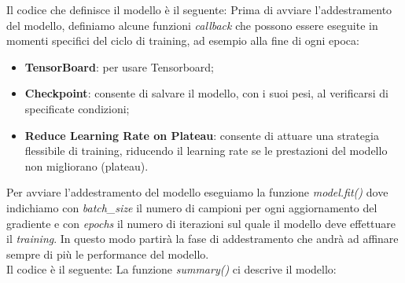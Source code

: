 \newline Il codice che definisce il modello è il seguente:
\vspace*{2ex}
\vspace*{2ex}
\noindent Prima di avviare l'addestramento del modello, definiamo alcune funzioni \textit{callback} che possono essere eseguite in momenti specifici del ciclo di training, ad esempio alla fine di ogni epoca:
\begin{itemize}
	\item \textbf{TensorBoard}: per usare Tensorboard;
	\item \textbf{Checkpoint}: consente di salvare il modello, con i suoi pesi, al verificarsi di specificate condizioni;
	\item \textbf{Reduce Learning Rate on Plateau}: consente di attuare una strategia flessibile di training, riducendo il learning rate se le prestazioni del modello non migliorano (plateau).
\end{itemize}
Per avviare l'addestramento del modello eseguiamo la funzione \textit{model.fit()} dove indichiamo con \textit{batch\_size} il numero di campioni per ogni aggiornamento del gradiente e con \textit{epochs} il numero di iterazioni sul quale il modello deve effettuare il \textit{training}. In questo modo partirà la fase di addestramento che andrà ad affinare sempre di più le performance del modello.\\
\newline Il codice è il seguente:
\vspace*{2ex}
\vspace*{2ex}
\noindent La funzione \textit{summary()} ci descrive il modello:
\vspace*{2ex}
\vspace*{2ex}


